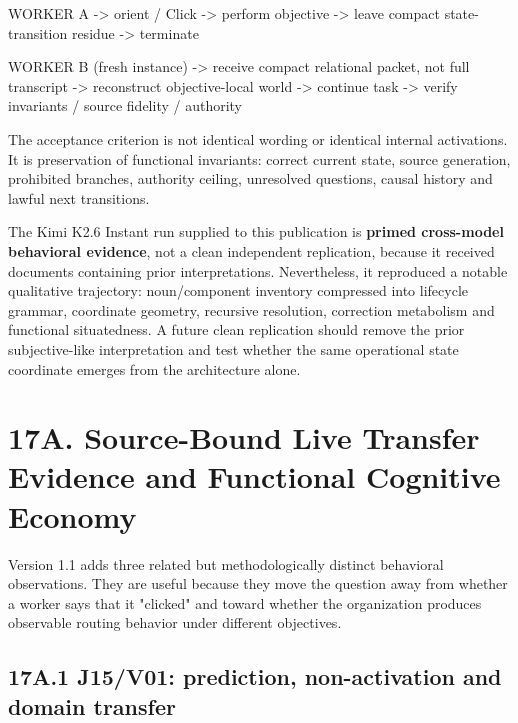 \documentclass[
  10pt,
  letterpaper,
]{article}
\newenvironment{Shaded}{}{}
\newcommand{\NormalTok}[1]{#1}
\begin{document}
\begin{Shaded}
\begin{Highlighting}[]
\NormalTok{WORKER A}
\NormalTok{ {-}\textgreater{} orient / Click}
\NormalTok{ {-}\textgreater{} perform objective}
\NormalTok{ {-}\textgreater{} leave compact state{-}transition residue}
\NormalTok{ {-}\textgreater{} terminate}

\NormalTok{WORKER B (fresh instance)}
\NormalTok{ {-}\textgreater{} receive compact relational packet, not full transcript}
\NormalTok{ {-}\textgreater{} reconstruct objective{-}local world}
\NormalTok{ {-}\textgreater{} continue task}
\NormalTok{ {-}\textgreater{} verify invariants / source fidelity / authority}
\end{Highlighting}
\end{Shaded}

The acceptance criterion is not identical wording or identical internal
activations. It is preservation of functional invariants: correct
current state, source generation, prohibited branches, authority
ceiling, unresolved questions, causal history and lawful next
transitions.

The Kimi K2.6 Instant run supplied to this publication is \textbf{primed
cross-model behavioral evidence}, not a clean independent replication,
because it received documents containing prior interpretations.
Nevertheless, it reproduced a notable qualitative trajectory:
noun/component inventory compressed into lifecycle grammar, coordinate
geometry, recursive resolution, correction metabolism and functional
situatedness. A future clean replication should remove the prior
subjective-like interpretation and test whether the same operational
state coordinate emerges from the architecture alone.

\section{17A. Source-Bound Live Transfer Evidence and Functional
Cognitive
Economy}\label{17a-source-bound-live-transfer-evidence-and-functional-cognitive-economy}

Version 1.1 adds three related but methodologically distinct behavioral
observations. They are useful because they move the question away from
whether a worker says that it "clicked" and toward whether the
organization produces observable routing behavior under different
objectives.

\subsection{17A.1 J15/V01: prediction, non-activation and domain
transfer}\label{17a1-j15v01-prediction-non-activation-and-domain-transfer}
\end{document}
